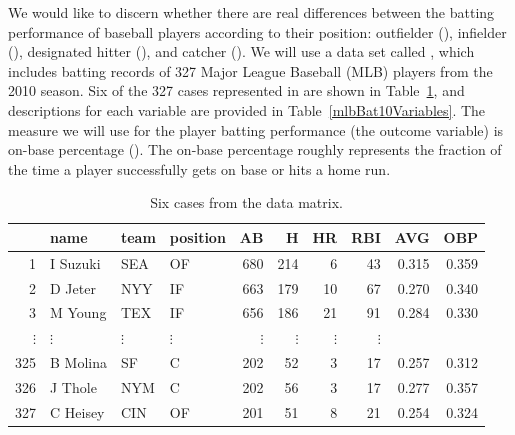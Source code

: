 We would like to discern whether there are real differences between the batting performance of baseball players according to their position: outfielder (), infielder (), designated hitter (), and catcher (). We will use a data set called , which includes batting records of 327 Major League Baseball (MLB) players from the 2010 season. Six of the 327 cases represented in  are shown in Table~\ref{mlbBat10DataMatrix}, and descriptions for each variable are provided in Table~\ref{mlbBat10Variables}. The measure we will use for the player batting performance (the outcome variable) is on-base percentage (). The on-base percentage roughly represents the fraction of the time a player successfully gets on base or hits a home run.

\begin{table}[h]
\centering
\begin{tabular}{rlllrrrrrr}
  \hline
 & name & team & position & AB & H & HR &RBI & AVG & OBP \\
  \hline
1 & I Suzuki & SEA & OF & 680 & 214 & 6 & 43 & 0.315 & 0.359 \\
  2 & D Jeter & NYY & IF & 663 & 179 & 10 & 67 & 0.270 & 0.340 \\
  3 & M Young & TEX & IF & 656 & 186 & 21 & 91 & 0.284 & 0.330 \\
  $\vdots$ & $\vdots$ & $\vdots$ & $\vdots$ & $\vdots$ & $\vdots$ & $\vdots$ & $\vdots$ \\
  325 & B Molina & SF & C & 202 & 52 & 3 & 17 & 0.257 & 0.312 \\
  326 & J Thole & NYM & C & 202 & 56 & 3 & 17 & 0.277 & 0.357 \\
  327 & C Heisey & CIN & OF & 201 & 51 & 8 & 21 & 0.254 & 0.324 \\
   \hline
\end{tabular}
\caption{Six cases from the  data matrix.}
\label{mlbBat10DataMatrix}
\end{table}

